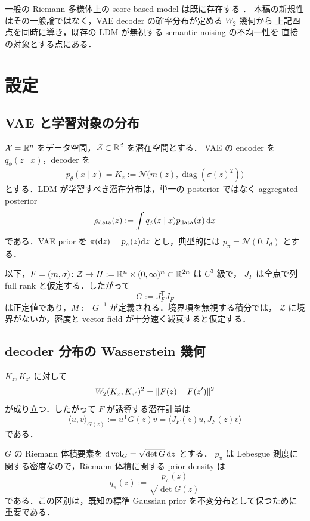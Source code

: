 \documentclass[uplatex,dvipdfmx,11pt,a4paper]{jsarticle}
\begin{document}
一般の Riemann 多様体上の score-based model は既に存在する \cite{debortoli2022}．
本稿の新規性はその一般論ではなく，VAE decoder の確率分布が定める $W_2$ 幾何から
上記四点を同時に導き，既存の LDM が無視する semantic noising の不均一性を
直接の対象とする点にある．

\section{設定}
\label{sec:setup}

\subsection{VAE と学習対象の分布}

$\mathcal{X}=\mathbb{R}^n$ をデータ空間，$\mathcal{Z}\subset\mathbb{R}^d$ を潜在空間とする．
VAE \cite{kingma2014} の encoder を $q_\phi(z\mid x)$，decoder を
\[
  p_\theta(x\mid z)=K_z
  :=\mathcal{N}\bigl(m(z),\operatorname{diag}(\sigma(z)^2)\bigr)
\]
とする．LDM が学習すべき潜在分布は，単一の posterior ではなく aggregated posterior
\[
  \rho_{\mathrm{data}}(z)
  :=\int q_\phi(z\mid x)p_{\mathrm{data}}(x)\,\mathrm{d} x
\]
である．VAE prior を $\pi(\mathrm{d} z)=p_\pi(z)\mathrm{d} z$ とし，典型的には
$p_\pi=\mathcal{N}(0,I_d)$ とする．

以下，$F=(m,\sigma)\colon\mathcal{Z}\to
H:=\mathbb{R}^n\times(0,\infty)^n\subset\mathbb{R}^{2n}$ は $C^3$ 級で，
$J_F$ は全点で列 full rank と仮定する．したがって
\[
  G:=J_F^{\mathsf T}J_F
\]
は正定値であり，$M:=G^{-1}$ が定義される．境界項を無視する積分では，
$\mathcal{Z}$ に境界がないか，密度と vector field が十分速く減衰すると仮定する．

\subsection{decoder 分布の Wasserstein 幾何}

\begin{fact}
\label{fact:gaussian-w2}
  $K_z,K_{z'}$ に対して
  \[
    W_2(K_z,K_{z'})^2=\lVert F(z)-F(z') \rVert^2
  \]
  が成り立つ．したがって $F$ が誘導する潜在計量は
  \[
    \langle u,v\rangle_{G(z)}
    :=u^{\mathsf T}G(z)v
    =\langle J_F(z)u,J_F(z)v\rangle
  \]
  である．
\end{fact}

$G$ の Riemann 体積要素を $\mathrm{d}\operatorname{vol}_G=\sqrt{\det G}\,\mathrm{d} z$ とする．
$p_\pi$ は Lebesgue 測度に関する密度なので，Riemann 体積に関する prior density は
\[
  q_\pi(z):=\frac{p_\pi(z)}{\sqrt{\det G(z)}}
\]
である．この区別は，既知の標準 Gaussian prior を不変分布として保つために重要である．
\end{document}
